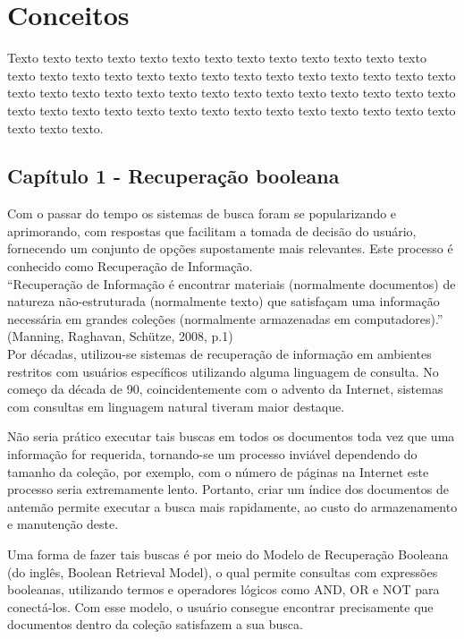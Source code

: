 \chapter{Conceitos}
\label{cap:conceitos}

Texto texto texto texto texto texto texto texto texto texto texto texto texto
texto texto texto texto texto texto texto texto texto texto texto texto texto
texto texto texto texto texto texto texto texto texto texto texto texto texto
texto texto texto texto texto texto texto texto texto texto texto texto texto
texto texto texto texto texto texto.

\section{Capítulo 1 - Recuperação booleana}
\label{sec:recuperacao_booleana}

Com o passar do tempo os sistemas de busca foram se popularizando e aprimorando, com respostas que facilitam a tomada de decisão do usuário, fornecendo um conjunto de opções supostamente mais relevantes. Este processo é conhecido como Recuperação de Informação. \\

“Recuperação de Informação é encontrar materiais (normalmente documentos) de natureza não-estruturada (normalmente texto) que satisfaçam uma informação necessária em grandes coleções (normalmente armazenadas em computadores).” (Manning, Raghavan, Schütze, 2008, p.1) \\

Por décadas, utilizou-se sistemas de recuperação de informação em ambientes restritos com usuários específicos utilizando alguma linguagem de consulta. No começo da década de 90, coincidentemente com o advento da Internet, sistemas com consultas em linguagem natural tiveram maior destaque.

Não seria prático executar tais buscas em todos os documentos toda vez que uma informação for requerida, tornando-se um processo inviável dependendo do tamanho da coleção, por exemplo, com o número de páginas na Internet este processo seria extremamente lento. Portanto, criar um índice dos documentos de antemão permite executar a busca mais rapidamente, ao custo do armazenamento e manutenção deste.

Uma forma de fazer tais buscas é por meio do Modelo de Recuperação Booleana (do inglês, Boolean Retrieval Model), o qual permite consultas com expressões booleanas, utilizando termos e operadores lógicos como AND, OR e NOT para conectá-los. Com esse modelo, o usuário consegue encontrar precisamente que documentos dentro da coleção satisfazem a sua busca. 

